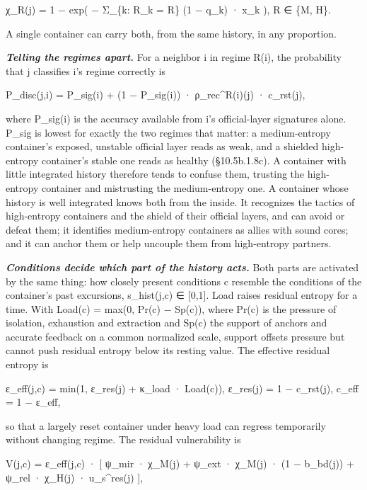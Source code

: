 \documentclass[
]{article}
\begin{document}
χ\_R(j) = 1 − exp( − Σ\_\{k: R\_k = R\} (1 − q\_k) · x\_k ), R ∈ \{M,
H\}.

A single container can carry both, from the same history, in any
proportion.

\emph{\textbf{Telling the regimes apart.}} For a neighbor i in regime
R(i), the probability that j classifies i's regime correctly is

P\_disc(j,i) = P\_sig(i) + (1 − P\_sig(i)) · ρ\_rec\^{}R(i)(j) ·
c\_rst(j),

where P\_sig(i) is the accuracy available from i's official-layer
signatures alone. P\_sig is lowest for exactly the two regimes that
matter: a medium-entropy container's exposed, unstable official layer
reads as weak, and a shielded high-entropy container's stable one reads
as healthy (§10.5b.1.8c). A container with little integrated history
therefore tends to confuse them, trusting the high-entropy container and
mistrusting the medium-entropy one. A container whose history is well
integrated knows both from the inside. It recognizes the tactics of
high-entropy containers and the shield of their official layers, and can
avoid or defeat them; it identifies medium-entropy containers as allies
with sound cores; and it can anchor them or help uncouple them from
high-entropy partners.

\emph{\textbf{Conditions decide which part of the history acts.}} Both
parts are activated by the same thing: how closely present conditions c
resemble the conditions of the container's past excursions, s\_hist(j,c)
∈ {[}0,1{]}. Load raises residual entropy for a time. With Load(c) =
max(0, Pr(c) − Sp(c)), where Pr(c) is the pressure of isolation,
exhaustion and extraction and Sp(c) the support of anchors and accurate
feedback on a common normalized scale, support offsets pressure but
cannot push residual entropy below its resting value. The effective
residual entropy is

ε\_eff(j,c) = min(1, ε\_res(j) + κ\_load · Load(c)), ε\_res(j) = 1 −
c\_rst(j), c\_eff = 1 − ε\_eff,

so that a largely reset container under heavy load can regress
temporarily without changing regime. The residual vulnerability is

V(j,c) = ε\_eff(j,c) · {[} ψ\_mir · χ\_M(j) + ψ\_ext · χ\_M(j) · (1 −
b\_bd(j)) + ψ\_rel · χ\_H(j) · u\_s\^{}res(j) {]},
\end{document}
